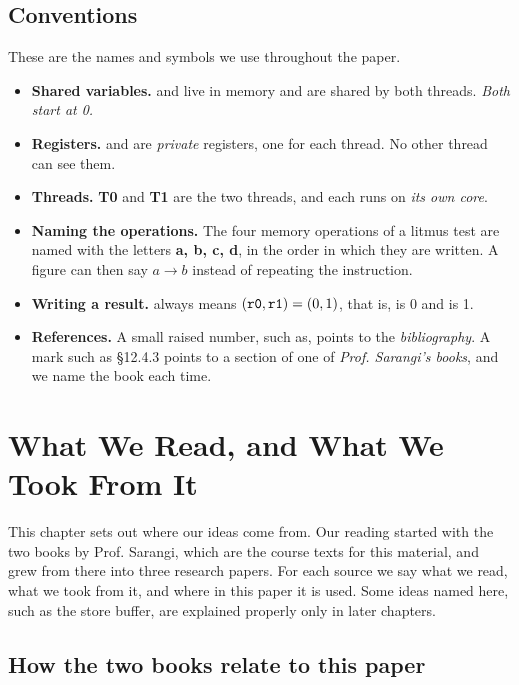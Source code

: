 \section{Conventions}
\label{sec:conventions}

These are the names and symbols we use throughout the paper.
\begin{itemize}
\item \textbf{Shared variables.}  and  live in memory and are shared by both threads. \emph{Both start at 0.}
\item \textbf{Registers.}  and  are \emph{private} registers, one for each thread. No other thread can see them.
\item \textbf{Threads.} \textbf{T0} and \textbf{T1} are the two threads, and each runs on \emph{its own core}.
\item \textbf{Naming the operations.} The four memory operations of a litmus test are named with the letters \textbf{a, b, c, d}, in the order in which they are written. A figure can then say $a \to b$ instead of repeating the instruction.
\item \textbf{Writing a result.}  always means $(\texttt{r0}, \texttt{r1}) = (0, 1)$, that is,  is 0 and  is 1.
\item \textbf{References.} A small raised number, such as\cite{lamport1979}, points to the \emph{bibliography}. A mark such as \S12.4.3 points to a section of one of \emph{Prof. Sarangi's books}, and we name the book each time.
\end{itemize}

\chapter{What We Read, and What We Took From It}
\label{ch:reading}

This chapter sets out where our ideas come from. Our reading started with the two books by Prof. Sarangi, which are the course texts for this material, and grew from there into three research papers. For each source we say what we read, what we took from it, and where in this paper it is used. Some ideas named here, such as the store buffer, are explained properly only in later chapters.

\section{How the two books relate to this paper}
\label{sec:books}

